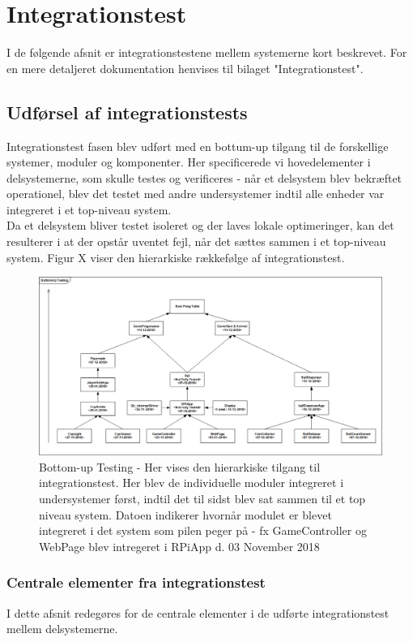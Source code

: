 \documentclass[Rapport/Rapport_main.tex]{subfiles}
\begin{document}
\section{Integrationstest}\label{sec:rap_integrationstest}
I de følgende afsnit er integrationstestene mellem systemerne kort beskrevet. For en mere detaljeret dokumentation henvises til bilaget "Integrationstest". 

\subsection{Udførsel af integrationstests}
Integrationstest fasen blev udført med en bottum-up tilgang til de forskellige systemer, moduler og komponenter. Her specificerede vi hovedelementer i delsystemerne, som skulle testes og verificeres - når et delsystem blev bekræftet operationel, blev det testet med andre undersystemer indtil alle enheder var integreret i et top-niveau system. \\
Da et delsystem bliver testet isoleret og der laves lokale optimeringer, kan det resulterer i at der opstår uventet fejl, når det sættes sammen i et top-niveau system. Figur X viser den hierarkiske rækkefølge af integrationstest. 
\begin{figure}[H]
    \centering
    \includegraphics[width=1\textwidth]{Rapport/Test/graphics/Buttom-Up.png}
    \caption{Bottom-up Testing - Her vises den hierarkiske tilgang til integrationstest. Her blev de individuelle moduler integreret i undersystemer først, indtil det til sidst blev sat sammen til et top niveau system. Datoen indikerer hvornår modulet er blevet integreret i det system som pilen peger på - fx GameController og WebPage blev intregeret i RPiApp d. 03 November 2018}
   \label{fig:Bottom-Up}
\end{figure}

\subsubsection{Centrale elementer fra integrationstest}
I dette afsnit redegøres for de centrale elementer i de udførte integrationstest mellem delsystemerne. 
\end{document}
